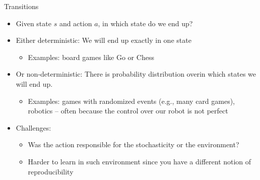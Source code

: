 \documentclass[aspectratio=169]{../latex_main/tntbeamer}  %
\begin{document}
\begin{frame}[c]{Transitions}
	
	\begin{itemize}
		\item Given state $s$ and action $a$, in which state do we end up?
		\smallskip
		\pause
		\item Either deterministic: We will end up exactly in one state
		\begin{itemize}
			\item Examples: board games like Go or Chess
		\end{itemize}
		\pause
		\item Or non-deterministic: There is probability distribution over\newline in which states we will end up.
		\begin{itemize}
			\item Examples: games with randomized events (e.g., many card games), robotics -- often because the control over our robot is not perfect
		\end{itemize}
		\item Challenges:
		\begin{itemize}
			\item Was the action responsible for the stochasticity or the environment?
			\item Harder to learn in such environment since you have a different notion of reproducibility
		\end{itemize}
	\end{itemize}
	
\end{frame}
\end{document}
